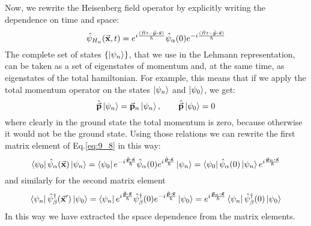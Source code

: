 \documentclass[../main/main.tex]{subfiles}
\begin{document}
Now, we rewrite the Heisenberg field operator by explicitly writing the dependence on time and space:
\begin{equation*}
  \hat{\psi }_{H_ \alpha } (\va{x},t) = e^{i \frac{ (\hat{H}t - \hat{\va{p}} \vdot \va{x})}{\hbar }} \hat{\psi }_ \alpha (0) e^{-i \frac{ (\hat{H}t - \hat{\va{p}} \vdot \va{x})}{\hbar }}
\end{equation*}
The complete set of states \( \{ \ket{\psi _n}  \}   \), that we use in the Lehmann representation, can be taken as a set of eigenstates of momentum and, at the same time, as eigenstates of the total hamiltonian.
For example, this means that if we apply the total momentum operator on the states \( \ket{\psi _n}  \) and \( \ket{\psi _0}  \), we get:
\begin{equation*}
  \hat{\va{p}} \ket{\psi _n } = \va{p}_n \ket{\psi _n},   \qquad \hat{\va{p}} \ket{\psi _0} = 0
\end{equation*}
where clearly in the ground state the total momentum is zero, because otherwise it would not be the ground state.
Using those relations we can rewrite the first matrix element of Eq.\eqref{eq:9_8} in this way:
\begin{equation*}
  \bra{\psi _0} \hat{\psi }_ \alpha (\va{x}) \ket{\psi _n}
  = \bra{\psi _0}  e^{-i \frac{\hat{\va{p}} \vdot \va{x}}{\hbar }}
  \hat{\psi }_ \alpha (0)   e^{i \frac{\hat{\va{p}} \vdot \va{x}}{\hbar }} \ket{\psi _n}
  = \bra{\psi _0} \hat{\psi }_ \alpha (0) \ket{\psi _n} e^{i \frac{\va{p}_n \vdot \va{x}}{\hbar }}
\end{equation*}
and similarly for the second matrix element
\begin{equation*}
  \bra{\psi _n} \hat{\psi }_ \beta ^\dag (\va{x}') \ket{\psi _0}
  = \bra{\psi _n}  e^{i \frac{\hat{\va{p}} \vdot \va{x}}{\hbar }}
  \hat{\psi }_ \beta ^\dag (0)   e^{-i \frac{\hat{\va{p}} \vdot \va{x}}{\hbar }} \ket{\psi _0}
  = e^{i \frac{\va{p}_n \vdot \va{x}}{\hbar }}   \bra{\psi _n} \hat{\psi }_ \beta ^\dag  (0) \ket{\psi _0}
\end{equation*}
In this way we have extracted the space dependence from the matrix elements.
\end{document}
